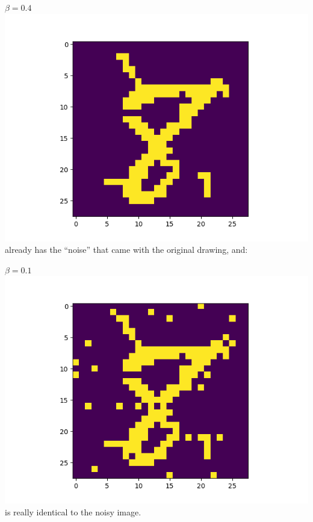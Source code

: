\documentclass[11pt]{article}
\begin{document}
$\beta=0.4$
\includegraphics[scale=0.2]{alpha_1_beta_04}
already has the ``noise'' that came with the original drawing, and:

$\beta=0.1$
\includegraphics[scale=0.2]{alpha_1_beta_01}
is really identical to the noisy image.
\end{document}
